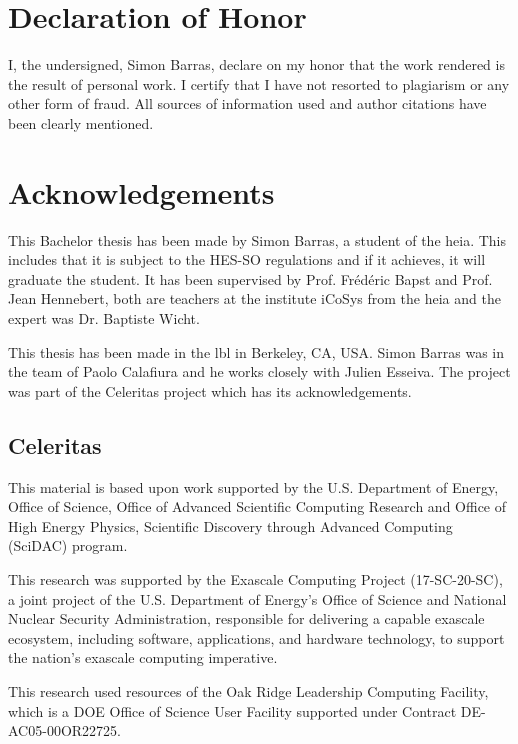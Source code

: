 \chapter{Declaration of Honor}
\label{ch:honour}
I, the undersigned, Simon Barras, declare on my honor that the work rendered is the result of
personal work. I certify that I have not resorted to plagiarism or any other form of fraud.
All sources of information used and author citations have been clearly mentioned.



\chapter{Acknowledgements}
\label{ch:remerciement}

This Bachelor thesis has been made by Simon Barras, a student of the \acrlong{heia}.
This includes that it is subject to the HES-SO regulations and if it achieves, it
will graduate the student.
It has been supervised by Prof. Frédéric Bapst and Prof. Jean Hennebert, both
are teachers at the institute iCoSys from the \acrshort{heia} and the expert was Dr. Baptiste Wicht.

This thesis has been made in the \acrlong{lbl} in Berkeley, CA, USA.
Simon Barras was in the team of Paolo Calafiura and he works closely with Julien
Esseiva.
The project was part of the Celeritas project which has its acknowledgements.

\section{Celeritas}
\label{ch:acknowledgements:celeritas}

This material is based upon work supported by the U.S. Department of Energy,
Office of Science, Office of Advanced Scientific Computing Research and Office
of High Energy Physics, Scientific Discovery through Advanced Computing (SciDAC)
program.

This research was supported by the Exascale Computing Project (17-SC-20-SC), a
joint project of the U.S. Department of Energy's Office of Science and National
Nuclear Security Administration, responsible for delivering a capable exascale
ecosystem, including software, applications, and hardware technology, to support
the nation's exascale computing imperative.

This research used resources of the Oak Ridge Leadership Computing Facility,
which is a DOE Office of Science User Facility supported under Contract
DE-AC05-00OR22725.

